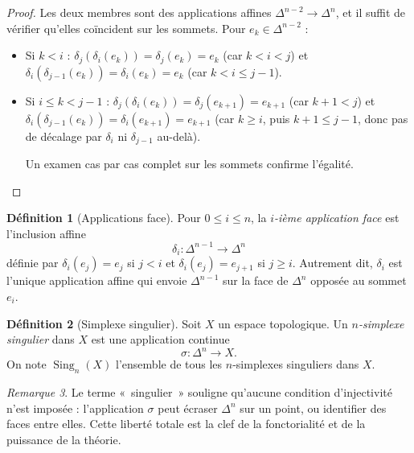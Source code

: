 \documentclass[12pt,a4paper,openany]{book}
\theoremstyle{definition}
\newtheorem{definition}{Définition}[chapter]
\theoremstyle{plain}
\theoremstyle{remark}
\newtheorem{remarque}[definition]{Remarque}
\begin{document}
\begin{proof}
Les deux membres sont des applications affines $\Delta^{n-2} \to \Delta^n$, et il suffit de
vérifier qu'elles coïncident sur les sommets. Pour $e_k \in \Delta^{n-2}$ :
\begin{itemize}
  \item Si $k < i$ : $\delta_j(\delta_i(e_k)) = \delta_j(e_k) = e_k$ (car $k < i < j$)
  et $\delta_i(\delta_{j-1}(e_k)) = \delta_i(e_k) = e_k$ (car $k < i \leq j-1$).
  \item Si $i \leq k < j-1$ : $\delta_j(\delta_i(e_k)) = \delta_j(e_{k+1}) = e_{k+1}$ (car $k+1 < j$)
  et $\delta_i(\delta_{j-1}(e_k)) = \delta_i(e_{k+1}) = e_{k+1}$ (car $k \geq i$, puis $k+1 \leq j-1$, donc pas de décalage par $\delta_i$ ni $\delta_{j-1}$ au-delà).

  Un examen cas par cas complet sur les sommets confirme l'égalité.
\end{itemize}
\end{proof}

\begin{definition}[Applications face]\label{def:applications-face}
Pour $0 \leq i \leq n$, la \emph{$i$-ième application face} est l'inclusion affine
\[
  \delta_i \colon \Delta^{n-1} \longrightarrow \Delta^n
\]
définie par $\delta_i(e_j) = e_j$ si $j < i$ et $\delta_i(e_j) = e_{j+1}$ si $j \geq i$.
Autrement dit, $\delta_i$ est l'unique application affine qui envoie $\Delta^{n-1}$ sur la face
de $\Delta^n$ opposée au sommet $e_i$.
\end{definition}

\begin{definition}[Simplexe singulier]\label{def:simplexe-singulier}
Soit $X$ un espace topologique. Un \emph{$n$-simplexe singulier} dans $X$ est une application
continue
\[
  \sigma \colon \Delta^n \longrightarrow X.
\]
On note $\operatorname{Sing}_n(X)$ l'ensemble de tous les $n$-simplexes singuliers dans $X$.
\end{definition}

\begin{remarque}\label{rem:singulier-pas-injectif}
Le terme «~singulier~» souligne qu'aucune condition d'injectivité n'est imposée : l'application
$\sigma$ peut écraser $\Delta^n$ sur un point, ou identifier des faces entre elles. Cette liberté
totale est la clef de la fonctorialité et de la puissance de la théorie.
\end{remarque}
\end{document}
